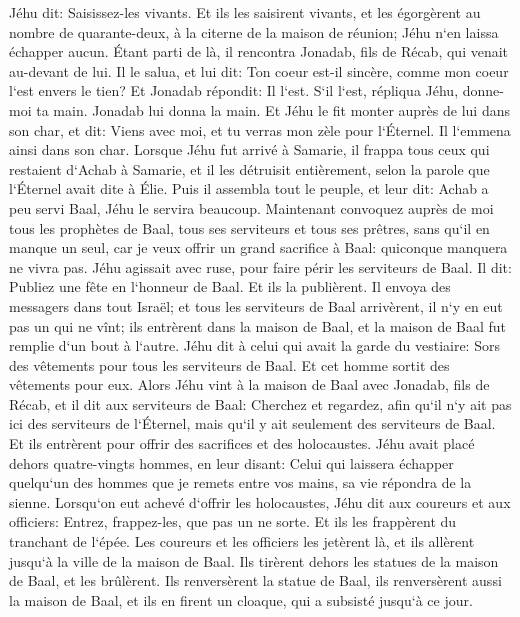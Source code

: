\verse Jéhu dit: Saisissez-les vivants. Et ils les saisirent vivants, et les égorgèrent au nombre de quarante-deux, à la citerne de la maison de réunion; Jéhu n`en laissa échapper aucun. 
\verse Étant parti de là, il rencontra Jonadab, fils de Récab, qui venait au-devant de lui. Il le salua, et lui dit: Ton coeur est-il sincère, comme mon coeur l`est envers le tien? Et Jonadab répondit: Il l`est. S`il l`est, répliqua Jéhu, donne-moi ta main. Jonadab lui donna la main. Et Jéhu le fit monter auprès de lui dans son char, 
\verse et dit: Viens avec moi, et tu verras mon zèle pour l`Éternel. Il l`emmena ainsi dans son char. 
\verse Lorsque Jéhu fut arrivé à Samarie, il frappa tous ceux qui restaient d`Achab à Samarie, et il les détruisit entièrement, selon la parole que l`Éternel avait dite à Élie. 
\verse Puis il assembla tout le peuple, et leur dit: Achab a peu servi Baal, Jéhu le servira beaucoup. 
\verse Maintenant convoquez auprès de moi tous les prophètes de Baal, tous ses serviteurs et tous ses prêtres, sans qu`il en manque un seul, car je veux offrir un grand sacrifice à Baal: quiconque manquera ne vivra pas. Jéhu agissait avec ruse, pour faire périr les serviteurs de Baal. 
\verse Il dit: Publiez une fête en l`honneur de Baal. Et ils la publièrent. 
\verse Il envoya des messagers dans tout Israël; et tous les serviteurs de Baal arrivèrent, il n`y en eut pas un qui ne vînt; ils entrèrent dans la maison de Baal, et la maison de Baal fut remplie d`un bout à l`autre. 
\verse Jéhu dit à celui qui avait la garde du vestiaire: Sors des vêtements pour tous les serviteurs de Baal. Et cet homme sortit des vêtements pour eux. 
\verse Alors Jéhu vint à la maison de Baal avec Jonadab, fils de Récab, et il dit aux serviteurs de Baal: Cherchez et regardez, afin qu`il n`y ait pas ici des serviteurs de l`Éternel, mais qu`il y ait seulement des serviteurs de Baal. 
\verse Et ils entrèrent pour offrir des sacrifices et des holocaustes. Jéhu avait placé dehors quatre-vingts hommes, en leur disant: Celui qui laissera échapper quelqu`un des hommes que je remets entre vos mains, sa vie répondra de la sienne. 
\verse Lorsqu`on eut achevé d`offrir les holocaustes, Jéhu dit aux coureurs et aux officiers: Entrez, frappez-les, que pas un ne sorte. Et ils les frappèrent du tranchant de l`épée. Les coureurs et les officiers les jetèrent là, et ils allèrent jusqu`à la ville de la maison de Baal. 
\verse Ils tirèrent dehors les statues de la maison de Baal, et les brûlèrent. 
\verse Ils renversèrent la statue de Baal, ils renversèrent aussi la maison de Baal, et ils en firent un cloaque, qui a subsisté jusqu`à ce jour. 
